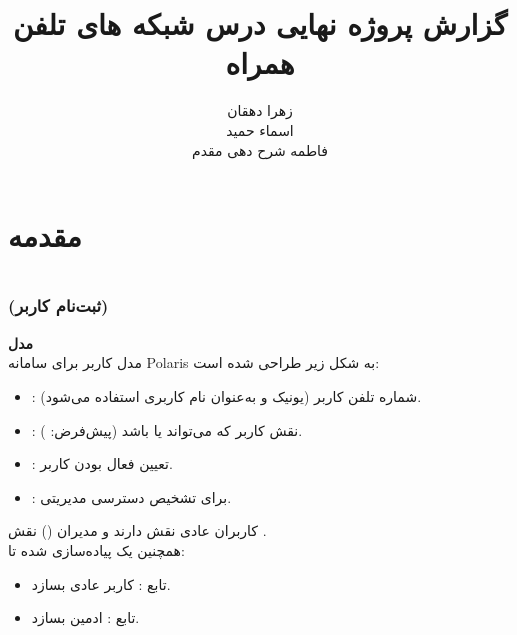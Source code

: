 \documentclass{report}
\title{گزارش پروژه نهایی درس شبکه های تلفن همراه}
\author{زهرا دهقان\\اسماء حمید\\فاطمه شرح دهی مقدم}
\begin{document}
\Godpage
\maketitle
{}
\tableofcontents


\chapter{مقدمه}








\chapter{ }

\section{}

\subsection{ (ثبت‌نام کاربر)}
\textbf{مدل } \\
مدل کاربر برای سامانه Polaris به شکل زیر طراحی شده است:

\begin{itemize}
  \item {}: شماره تلفن کاربر (یونیک و به‌عنوان نام کاربری استفاده می‌شود).
  \item {}: نقش کاربر که می‌تواند  یا  باشد (پیش‌فرض: ).
  \item {}: تعیین فعال بودن کاربر.
  \item {}: برای تشخیص دسترسی مدیریتی.
\end{itemize}

کاربران عادی نقش  دارند و مدیران () نقش . \\
همچنین یک  پیاده‌سازی شده تا:
\begin{itemize}
  \item تابع : کاربر عادی بسازد.
  \item تابع : ادمین بسازد.
\end{itemize}
\end{document}
